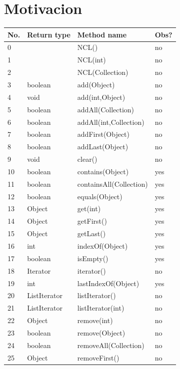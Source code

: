 \section{Motivacion}


\begin{table}[H]
\center
{\scriptsize
\begin{tabular}{|l|l|l|l|}
\hline
No. &Return type & Method name & Obs? \\
\hline
    0 && NCL() & no \\
    1& & NCL(int) & no \\
    2&& NCL(Collection) & no \\
    3&boolean & add(Object) & no \\
    4&void&add(int,Object) & no \\
    5&boolean&addAll(Collection) & no\\
    6&boolean&addAll(int,Collection) & no \\
    7&boolean&addFirst(Object) & no \\
    8&boolean&addLast(Object) & no\\
    9&void&clear() & no\\
    10&boolean&contains(Object) & yes \\
    11&boolean&containsAll(Collection) & yes \\
    12&boolean&equals(Object) & yes \\
    13&Object&get(int) & yes\\
    14&Object&getFirst() &yes \\
    15&Object&getLast() & yes\\
    16&int&indexOf(Object) &yes\\
    17&boolean&isEmpty() & yes\\
    18&Iterator&iterator() & no\\
    19&int&lastIndexOf(Object) &yes \\
    20&ListIterator&listIterator() &no \\
    21&ListIterator&listIterator(int) & no\\
    22&Object&remove(int) &no\\
    23&boolean&remove(Object) & no \\
    24&boolean&removeAll(Collection) & no \\
    25&Object&removeFirst() &no\\

\end{tabular}}
\end{table}

